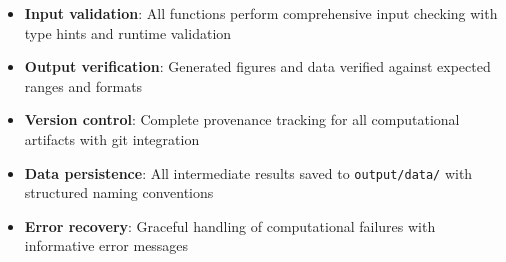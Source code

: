 \documentclass[
  13pt,
  a4paperpaper,
  12pt]{article}
\newcommand{\passthrough}[1]{#1}
\providecommand{\tightlist}{%
  \setlength{\itemsep}{0pt}\setlength{\parskip}{0pt}}
\begin{document}
\begin{itemize}
\tightlist
\item
  \textbf{Input validation}: All functions perform comprehensive input
  checking with type hints and runtime validation
\item
  \textbf{Output verification}: Generated figures and data verified
  against expected ranges and formats
\item
  \textbf{Version control}: Complete provenance tracking for all
  computational artifacts with git integration
\item
  \textbf{Data persistence}: All intermediate results saved to
  \passthrough{\lstinline!output/data/!} with structured naming
  conventions
\item
  \textbf{Error recovery}: Graceful handling of computational failures
  with informative error messages
\end{itemize}
\end{document}

